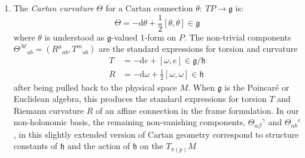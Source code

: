 \documentclass[11pt,a4paper]{article}
\numberwithin{equation}{section}
\begin{document}
\begin{enumerate}
    \item The \textit{Cartan curvature} $\Theta$ for a Cartan connection $\theta: \ TP \rightarrow \mathfrak{g}$ is:
        \begin{equation}
            \Theta = - \mathrm{d} \theta + \frac{1}{2} [\theta, \theta] \in \mathfrak{g} \label{eq:CartanCurvatureNormal}
        \end{equation}
        where $\theta$ is understood as $\mathfrak{g}$-valued 1-form on $P$. The non-trivial components \linebreak $\Theta^{\mathcal{M}}{}_{ab} = \left({R^{\mu}}_{ab} , T^{m}{}_{ab} \right)$ are the standard expressions for torsion and curvature
        \begin{align}
            T &= - \mathrm{d} e + [\omega, e ] \in \mathfrak{g}/\mathfrak{h} \label{eq:TorsionStandard} \\
            R &= - \mathrm{d}\omega + \frac{1}{2}[\omega , \omega] \in \mathfrak{h} \label{eq:CurvatureStandard}
        \end{align}
        after being pulled back to the physical space $M$. When $\mathfrak{g}$ is the Poincar\'e or Euclidean algebra, this produces the standard expressions for torsion $T$ and Riemann curvature $R$ of an affine connection in the frame formulation. In our non-holonomic basis, the remaining non-vanishing components, $\Theta_{\alpha \beta}{}^\gamma$ and $\Theta_{\alpha b }{}^c$, in this slightly extended version of Cartan geometry correspond to structure constants of $\mathfrak{h}$ and the action of $\mathfrak{h}$ on the $T_{\pi(p)}M$
\end{enumerate}
\end{document}
